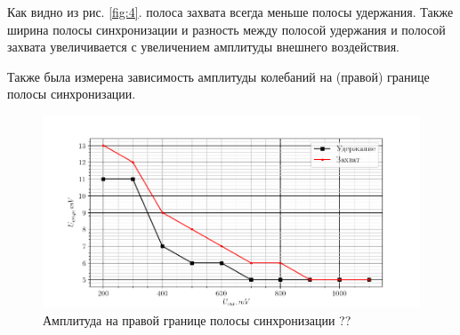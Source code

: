 Как видно из рис. \ref{fig:4}. полоса захвата всегда меньше полосы удержания. Также ширина полосы синхронизации и
разность между полосой удержания и полосой захвата увеличивается с увеличением амплитуды внешнего воздействия.

Также была измерена зависимость амплитуды колебаний на (правой) границе полосы синхронизации.

\begin{figure}[H]
	\centering
	\includegraphics[width = .85\linewidth]{graphs/amps1.png}
	\caption{Амплитуда на правой границе полосы синхронизации ??}
	\label{fig:5}
\end{figure}

